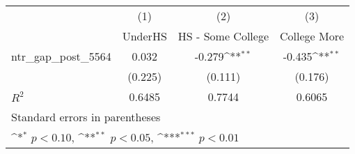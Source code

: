 {
\def\sym#1{\ifmmode^{#1}\else\(^{#1}\)\fi}
\begin{tabular}{l*{3}{c}}
\toprule
                    &\multicolumn{1}{c}{(1)}&\multicolumn{1}{c}{(2)}&\multicolumn{1}{c}{(3)}\\
                    &\multicolumn{1}{c}{UnderHS}&\multicolumn{1}{c}{HS - Some College}&\multicolumn{1}{c}{College More}\\
\midrule
ntr\_gap\_post\_5564   &    0.032         &   -0.279\sym{**} &   -0.435\sym{**} \\
                    &  (0.225)         &  (0.111)         &  (0.176)         \\
\midrule
\(R^{2}\)           &   0.6485         &   0.7744         &   0.6065         \\
\bottomrule
\multicolumn{4}{l}{\footnotesize Standard errors in parentheses}\\
\multicolumn{4}{l}{\footnotesize \sym{*} \(p<0.10\), \sym{**} \(p<0.05\), \sym{***} \(p<0.01\)}\\
\end{tabular}
}
